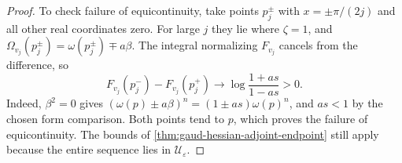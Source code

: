 \begin{proof}
To check failure of equicontinuity, take points $p_j^\pm$ with $x=\pm\pi/(2j)$ and all other real coordinates zero. For large $j$ they lie where $\zeta=1$, and
$\Omega_{v_j}(p_j^\pm)=\omega(p_j^\pm)\mp a\beta$. The integral normalizing $F_{v_j}$ cancels from the difference, so
\[
 F_{v_j}(p_j^-)-F_{v_j}(p_j^+)
       \longrightarrow\log\frac{1+as}{1-as}>0.
\]
Indeed, $\beta^2=0$ gives $(\omega(p)\pm a\beta)^n=(1\pm as)\omega(p)^n$, and $as<1$ by the chosen form comparison. Both points tend to $p$, which proves the failure of equicontinuity. The bounds of \cref{thm:gaud-hessian-adjoint-endpoint} still apply because the entire sequence lies in $\mathcal U_\varepsilon$.
\end{proof}

